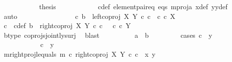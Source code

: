 \begin{isabellebody}
\ \ \ \ \ \ \ \ \isamarkupfalse%
\ \isamarkupfalse%
\ {\isacharquery}{\kern0pt}thesis\isanewline
\ \ \ \ \ \ \ \ \ \ \isamarkupfalse%
\ c{\isacharunderscore}{\kern0pt}def\ element{\isacharunderscore}{\kern0pt}pair{\isacharunderscore}{\kern0pt}eq\ eqs\ m{\isacharunderscore}{\kern0pt}proj{\isacharunderscore}{\kern0pt}a\ x{\isacharunderscore}{\kern0pt}def\ y{}y{}{\isacharunderscore}{\kern0pt}def{\isacharparenleft}{\kern0pt}{}{\isacharparenright}{\kern0pt}\ \isamarkupfalse%
\ auto\isanewline
\ \ \ \ \ \ \isamarkupfalse%
\isanewline
\ \ \ \ \ \ \ \ \isamarkupfalse%
\ {\isachardoublequoteopen}{\isasymnexists}c{\isachardot}{\kern0pt}\ b\ {\isacharequal}{\kern0pt}\ left{\isacharunderscore}{\kern0pt}coproj\ X\ Y\ {\isasymcirc}\isactrlsub c\ c\ {\isasymand}\ c\ {\isasymin}\isactrlsub c\ X{\isachardoublequoteclose}\isanewline
\ \ \ \ \ \ \ \ \isamarkupfalse%
\ \isamarkupfalse%
\ c\ \ c{\isacharunderscore}{\kern0pt}def{\isacharcolon}{\kern0pt}\ {\isachardoublequoteopen}b\ {\isacharequal}{\kern0pt}\ right{\isacharunderscore}{\kern0pt}coproj\ X\ Y\ {\isasymcirc}\isactrlsub c\ c\ \ {\isasymand}\ c\ {\isasymin}\isactrlsub c\ Y{\isachardoublequoteclose}\isanewline
\ \ \ \ \ \ \ \ \ \ \isamarkupfalse%
\ b{\isacharunderscore}{\kern0pt}type\ coprojs{\isacharunderscore}{\kern0pt}jointly{\isacharunderscore}{\kern0pt}surj\ \isamarkupfalse%
\ blast\isanewline
\ \ \ \ \ \ \ \ \isamarkupfalse%
\ {\isachardoublequoteopen}a\ {\isacharequal}{\kern0pt}\ b{\isachardoublequoteclose}\isanewline
\ \ \ \ \ \ \ \ \isamarkupfalse%
{\isacharparenleft}{\kern0pt}cases\ {\isachardoublequoteopen}c\ {\isacharequal}{\kern0pt}\ y{}{\isachardoublequoteclose}{\isacharparenright}{\kern0pt}\isanewline
\ \ \ \ \ \ \ \ \ \ \isamarkupfalse%
\ {\isachardoublequoteopen}c\ {\isacharequal}{\kern0pt}\ y{}{\isachardoublequoteclose}\ \ \ \ \ \ \ \isanewline
\ \ \ \ \ \ \ \ \ \ \isamarkupfalse%
\ m{\isacharunderscore}{\kern0pt}rightproj{\isacharunderscore}{\kern0pt}l{\isacharunderscore}{\kern0pt}equals{\isacharcolon}{\kern0pt}\ {\isachardoublequoteopen}m\ {\isasymcirc}\isactrlsub c\ right{\isacharunderscore}{\kern0pt}coproj\ X\ Y\ {\isasymcirc}\isactrlsub c\ c\ {\isacharequal}{\kern0pt}\ {\isasymlangle}x{}{\isacharcomma}{\kern0pt}\ y{}{\isasymrangle}{\isachardoublequoteclose}\isanewline

\end{isabellebody}
